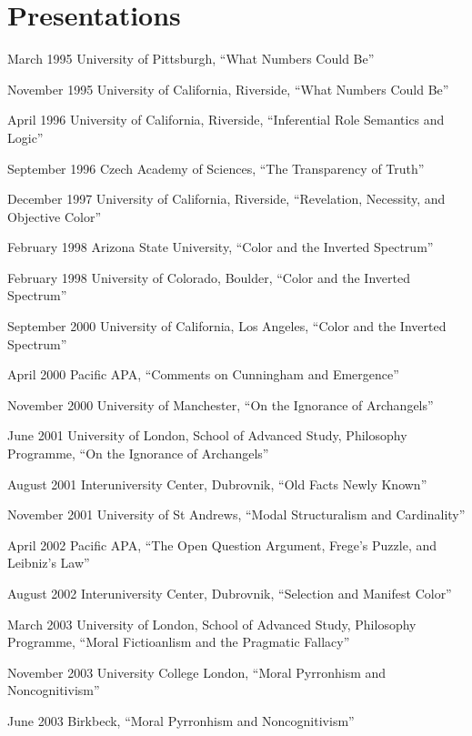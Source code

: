 \documentclass[contbibnum]{cv}
\newcommand\ucl{University College London}
\begin{document}
\section{Presentations}\label{sec:presentations} %
\begin{topic}
    \item[March 1995] University of Pittsburgh, ``What Numbers Could Be''
    \item[November 1995] University of California, Riverside, ``What Numbers Could Be''
    \item[April 1996] University of California, Riverside, ``Inferential Role Semantics and Logic''
    \item[September 1996] Czech Academy of Sciences, ``The Transparency of Truth''
    \item[December 1997] University of California, Riverside, ``Revelation, Necessity, and Objective Color''
    \item[February 1998] Arizona State University, ``Color and the Inverted Spectrum''
    \item[February 1998] University of Colorado, Boulder, ``Color and the Inverted Spectrum''
    \item[September 2000] University of California, Los Angeles, ``Color and the Inverted Spectrum''
    \item[April 2000] Pacific APA, ``Comments on Cunningham and Emergence''
    \item[November 2000] University of Manchester, ``On the Ignorance of Archangels''
    \item[June 2001] University of London, School of Advanced Study, Philosophy Programme, ``On the Ignorance of Archangels''
    \item[August 2001] Interuniversity Center, Dubrovnik, ``Old Facts Newly Known''
    \item[November 2001] University of St Andrews, ``Modal Structuralism and Cardinality''
    \item[April 2002] Pacific APA, ``The Open Question Argument, Frege's Puzzle, and Leibniz's Law''
    \item[August 2002] Interuniversity Center, Dubrovnik, ``Selection and Manifest Color'' 
    \item[March 2003] University of London, School of Advanced Study, Philosophy Programme, ``Moral Fictioanlism and the Pragmatic Fallacy''
    \item[November 2003] \ucl, ``Moral Pyrronhism and Noncognitivism''
    \item[June 2003] Birkbeck, ``Moral Pyrronhism and Noncognitivism''

\end{topic}
\end{document}
